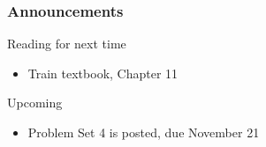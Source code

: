 \documentclass{beamer}\usepackage[]{graphicx}\usepackage[]{color}
\begin{document}
\begin{frame}\frametitle{Announcements}
    Reading for next time
    \begin{itemize}
        \item Train textbook, Chapter 11
    \end{itemize}
    \vspace{3ex}
    Upcoming
    \begin{itemize}
        \item Problem Set 4 is posted, due November 21
    \end{itemize}
\end{frame}
\end{document}
